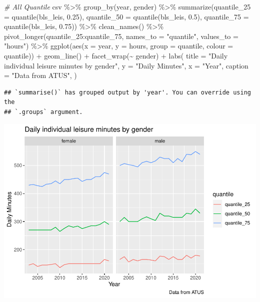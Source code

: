 \documentclass[
]{article}
\newenvironment{Shaded}{\begin{snugshade}}{\end{snugshade}}
\newcommand{\AttributeTok}[1]{\textcolor[rgb]{0.77,0.63,0.00}{#1}}
\newcommand{\CommentTok}[1]{\textcolor[rgb]{0.56,0.35,0.01}{\textit{#1}}}
\newcommand{\FloatTok}[1]{\textcolor[rgb]{0.00,0.00,0.81}{#1}}
\newcommand{\FunctionTok}[1]{\textcolor[rgb]{0.00,0.00,0.00}{#1}}
\newcommand{\NormalTok}[1]{#1}
\newcommand{\SpecialCharTok}[1]{\textcolor[rgb]{0.00,0.00,0.00}{#1}}
\newcommand{\StringTok}[1]{\textcolor[rgb]{0.31,0.60,0.02}{#1}}
\begin{document}
\begin{Shaded}
\begin{Highlighting}[]
\CommentTok{\# All Quantile}
\NormalTok{csv }\SpecialCharTok{\%\textgreater{}\%}
  \FunctionTok{group\_by}\NormalTok{(year, gender) }\SpecialCharTok{\%\textgreater{}\%}
  \FunctionTok{summarize}\NormalTok{(}\AttributeTok{quantile\_25 =} \FunctionTok{quantile}\NormalTok{(bls\_leis, }\FloatTok{0.25}\NormalTok{), }\AttributeTok{quantile\_50 =} \FunctionTok{quantile}\NormalTok{(bls\_leis, }\FloatTok{0.5}\NormalTok{), }\AttributeTok{quantile\_75 =} \FunctionTok{quantile}\NormalTok{(bls\_leis, }\FloatTok{0.75}\NormalTok{)) }\SpecialCharTok{\%\textgreater{}\%}
  \FunctionTok{clean\_names}\NormalTok{() }\SpecialCharTok{\%\textgreater{}\%}
  \FunctionTok{pivot\_longer}\NormalTok{(quantile\_25}\SpecialCharTok{:}\NormalTok{quantile\_75, }\AttributeTok{names\_to =} \StringTok{"quantile"}\NormalTok{, }\AttributeTok{values\_to =} \StringTok{"hours"}\NormalTok{) }\SpecialCharTok{\%\textgreater{}\%}
  \FunctionTok{ggplot}\NormalTok{(}\FunctionTok{aes}\NormalTok{(}\AttributeTok{x =}\NormalTok{ year, }\AttributeTok{y =}\NormalTok{ hours, }\AttributeTok{group =}\NormalTok{ quantile, }\AttributeTok{colour =}\NormalTok{ quantile)) }\SpecialCharTok{+}
  \FunctionTok{geom\_line}\NormalTok{() }\SpecialCharTok{+}
    \FunctionTok{facet\_wrap}\NormalTok{(}\SpecialCharTok{\textasciitilde{}}\NormalTok{ gender) }\SpecialCharTok{+}
  \FunctionTok{labs}\NormalTok{(}
  \AttributeTok{title =} \StringTok{"Daily individual leisure minutes by gender"}\NormalTok{,}
  \AttributeTok{y =} \StringTok{"Daily Minutes"}\NormalTok{,}
  \AttributeTok{x =} \StringTok{"Year"}\NormalTok{,}
  \AttributeTok{caption =} \StringTok{"Data from ATUS"}\NormalTok{,}
\NormalTok{) }
\end{Highlighting}
\end{Shaded}

\begin{verbatim}
## `summarise()` has grouped output by 'year'. You can override using the
## `.groups` argument.
\end{verbatim}

\includegraphics{Paper2_files/figure-latex/graphs-8.pdf}
\end{document}
